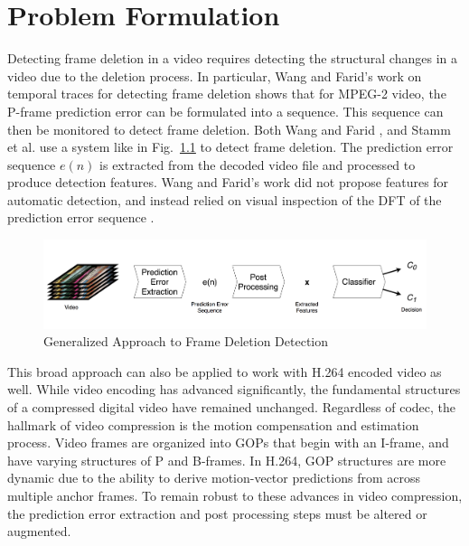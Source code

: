 \chapter{Problem Formulation}

Detecting frame deletion in a video requires detecting the structural changes in a video due to the deletion process. In particular, Wang and Farid's work on temporal traces for detecting frame deletion shows that for MPEG-2 video, the P-frame prediction error can be formulated into a sequence. This sequence can then be monitored to detect frame deletion. Both Wang and Farid \cite{wang}, and Stamm et al. \cite{stamm} use a system like in Fig.~\ref{System} to detect frame deletion. The prediction error sequence $e(n)$ is extracted from the decoded video file and processed to produce detection features. Wang and Farid's work did not propose features for automatic detection, and instead relied on visual inspection of the DFT of the prediction error sequence \cite{wang} \cite{stamm}.

\begin{figure}[htbp]
\centerline{\includegraphics[width=0.9\linewidth]{ProblemFormulation/frame_deletion_detection_system.png}}
\caption{Generalized Approach to Frame Deletion Detection}
\label{System}
\end{figure}

This broad approach can also be applied to work with H.264 encoded video as well. While video encoding has advanced significantly, the fundamental structures of a compressed digital video have remained unchanged. Regardless of codec, the hallmark of video compression is the motion compensation and estimation process. Video frames are organized into GOPs that begin with an I-frame, and have varying structures of P and B-frames. In H.264, GOP structures are more dynamic due to the ability to derive motion-vector predictions from across multiple anchor frames. To remain robust to these advances in video compression, the prediction error extraction and post processing steps must be altered or augmented.

